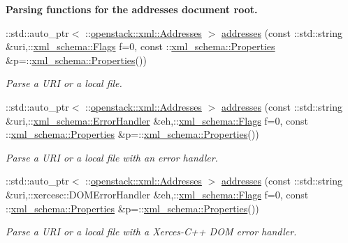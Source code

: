 \begin{Indent}{\bf Parsing functions for the addresses document root.}\par
\begin{DoxyCompactItemize}
\item 
::std::auto\_\-ptr$<$ ::\hyperlink{classopenstack_1_1xml_1_1Addresses}{openstack::xml::Addresses} $>$ \hyperlink{namespaceopenstack_1_1xml_a4eadfe9af8c5dcb726bbe53d5a7d5109}{addresses} (const ::std::string \&uri,::\hyperlink{namespacexml__schema_affb4c227cbd9aa7453dd1dc5a1401943}{xml\_\-schema::Flags} f=0, const ::\hyperlink{namespacexml__schema_ad27ce19a7ee1d3b1064092648898f64c}{xml\_\-schema::Properties} \&p=::\hyperlink{namespacexml__schema_ad27ce19a7ee1d3b1064092648898f64c}{xml\_\-schema::Properties}())
\begin{DoxyCompactList}\small\item\em Parse a URI or a local file. \item\end{DoxyCompactList}\item 
::std::auto\_\-ptr$<$ ::\hyperlink{classopenstack_1_1xml_1_1Addresses}{openstack::xml::Addresses} $>$ \hyperlink{namespaceopenstack_1_1xml_a8745dbf92df7113a5eb95522d0a55a43}{addresses} (const ::std::string \&uri,::\hyperlink{namespacexml__schema_ab1c9361bfd3b404eaabf0c31eded79dc}{xml\_\-schema::ErrorHandler} \&eh,::\hyperlink{namespacexml__schema_affb4c227cbd9aa7453dd1dc5a1401943}{xml\_\-schema::Flags} f=0, const ::\hyperlink{namespacexml__schema_ad27ce19a7ee1d3b1064092648898f64c}{xml\_\-schema::Properties} \&p=::\hyperlink{namespacexml__schema_ad27ce19a7ee1d3b1064092648898f64c}{xml\_\-schema::Properties}())
\begin{DoxyCompactList}\small\item\em Parse a URI or a local file with an error handler. \item\end{DoxyCompactList}\item 
::std::auto\_\-ptr$<$ ::\hyperlink{classopenstack_1_1xml_1_1Addresses}{openstack::xml::Addresses} $>$ \hyperlink{namespaceopenstack_1_1xml_a7423b9fbb6d47852cfa81d701dfd8f92}{addresses} (const ::std::string \&uri,::xercesc::DOMErrorHandler \&eh,::\hyperlink{namespacexml__schema_affb4c227cbd9aa7453dd1dc5a1401943}{xml\_\-schema::Flags} f=0, const ::\hyperlink{namespacexml__schema_ad27ce19a7ee1d3b1064092648898f64c}{xml\_\-schema::Properties} \&p=::\hyperlink{namespacexml__schema_ad27ce19a7ee1d3b1064092648898f64c}{xml\_\-schema::Properties}())
\begin{DoxyCompactList}\small\item\em Parse a URI or a local file with a Xerces-\/C++ DOM error handler. \item\end{DoxyCompactList}\item 

\end{DoxyCompactItemize}
\end{Indent}
